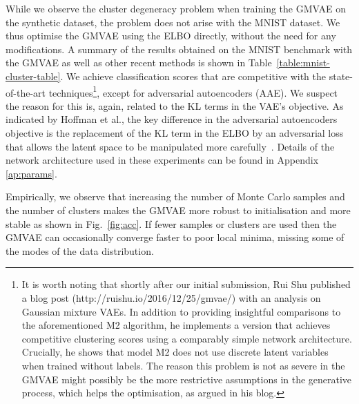 \documentclass{article} \usepackage{iclr2017_conference,times}
\begin{document}
While we observe the cluster degeneracy problem when training the GMVAE on the synthetic dataset, the problem does not arise with the MNIST dataset. We thus optimise the GMVAE using the ELBO directly, without the need for any modifications. A summary of the results obtained on the MNIST benchmark with the GMVAE as well as other recent methods is shown in Table~\ref{table:mnist-cluster-table}. We achieve classification scores that are competitive with the state-of-the-art techniques\footnote{It is worth noting that shortly after our initial submission, Rui Shu published a blog post (http://ruishu.io/2016/12/25/gmvae/) with an analysis on Gaussian mixture VAEs. In addition to providing insightful comparisons to the aforementioned M2 algorithm, he implements a version that achieves competitive clustering scores using a comparably simple network architecture. Crucially, he shows that model M2 does not use discrete latent variables when trained without labels. The reason this problem is not as severe in the GMVAE might possibly be the more restrictive assumptions in the generative process, which helps the optimisation, as argued in his blog.}, except for adversarial autoencoders (AAE). We suspect the reason for this is, again, related to the KL terms in the VAE's objective. As indicated by Hoffman et al., the key difference in the adversarial autoencoders objective is the replacement of the KL term in the ELBO by an adversarial loss that allows the latent space to be manipulated more carefully~\citep{Hoffman2016ELBO}. Details of the network architecture used in these experiments can be found in Appendix \ref{ap:params}.

Empirically, we observe that increasing the number of Monte Carlo samples and the number of clusters makes the GMVAE more robust to initialisation and more stable as shown in Fig.~\ref{fig:acc}. If fewer samples or clusters are used then the GMVAE can occasionally converge faster to poor local minima, missing some of the modes of the data distribution.
\end{document}
